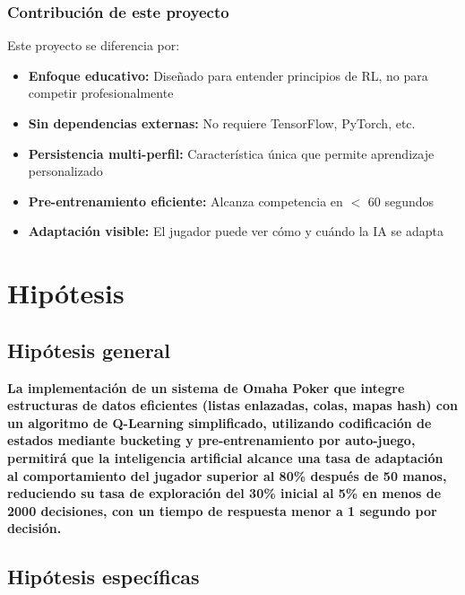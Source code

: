 \documentclass[12pt,a4paper]{article}
\begin{document}
\subsubsection{Contribución de este proyecto}

Este proyecto se diferencia por:

\begin{itemize}
    \item \textbf{Enfoque educativo:} Diseñado para entender principios de RL, no para competir profesionalmente
    \item \textbf{Sin dependencias externas:} No requiere TensorFlow, PyTorch, etc.
    \item \textbf{Persistencia multi-perfil:} Característica única que permite aprendizaje personalizado
    \item \textbf{Pre-entrenamiento eficiente:} Alcanza competencia en $<$ 60 segundos
    \item \textbf{Adaptación visible:} El jugador puede ver cómo y cuándo la IA se adapta
\end{itemize}

\newpage

\section{Hipótesis}

\subsection{Hipótesis general}

\textbf{La implementación de un sistema de Omaha Poker que integre estructuras de datos eficientes (listas enlazadas, colas, mapas hash) con un algoritmo de Q-Learning simplificado, utilizando codificación de estados mediante bucketing y pre-entrenamiento por auto-juego, permitirá que la inteligencia artificial alcance una tasa de adaptación al comportamiento del jugador superior al 80\% después de 50 manos, reduciendo su tasa de exploración del 30\% inicial al 5\% en menos de 2000 decisiones, con un tiempo de respuesta menor a 1 segundo por decisión.}

\subsection{Hipótesis específicas}
\end{document}
